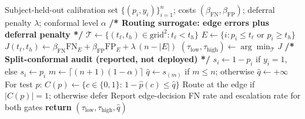 \begin{algorithm}[!t]
\caption{Cost-calibrated dual-threshold gate, with split-conformal audit}
\label{alg:gate}
\begin{algorithmic}[1]
\REQUIRE Subject-held-out calibration set $\{(p_i,y_i)\}_{i=1}^{n}$; costs $(\beta_{\mathrm{FN}},\beta_{\mathrm{FP}})$; deferral penalty $\lambda$; conformal level $\alpha$
\STATE \textbf{/* Routing surrogate: edge errors plus deferral penalty */}
\STATE $\mathcal{T}\leftarrow\{(t_\ell,t_h)\in \text{grid}^2 : t_\ell<t_h\}$
  \STATE $E\leftarrow\{i: p_i\le t_\ell \text{ or } p_i\ge t_h\}$ 
  \STATE $J(t_\ell,t_h)\leftarrow \beta_{\mathrm{FN}}\mathrm{FN}_{E}+\beta_{\mathrm{FP}}\mathrm{FP}_{E}+\lambda\,(n-|E|)$
\ENDFOR
\STATE $(\tau_{\mathrm{low}},\tau_{\mathrm{high}})\leftarrow\arg\min_{\mathcal{T}} J$ 
\STATE \textbf{/* Split-conformal audit (reported, not deployed) */}
\STATE $s_i\leftarrow 1-p_i$ if $y_i{=}1$, else $s_i\leftarrow p_i$
\STATE $m\leftarrow\lceil (n{+}1)(1{-}\alpha)\rceil$
\STATE $\hat{q}\leftarrow s_{(m)}$ if $m\le n$; otherwise $\hat{q}\leftarrow+\infty$
\STATE For test $p$: $C(p)\leftarrow\{c\in\{0,1\}:\,1-\hat{p}(c)\le\hat{q}\}$
\STATE Route at the edge if $|C(p)|{=}1$; otherwise defer 
\STATE Report edge-decision FN rate and escalation rate for both gates
\STATE \textbf{return} $(\tau_{\mathrm{low}},\tau_{\mathrm{high}},\hat{q})$
\end{algorithmic}
\end{algorithm}

